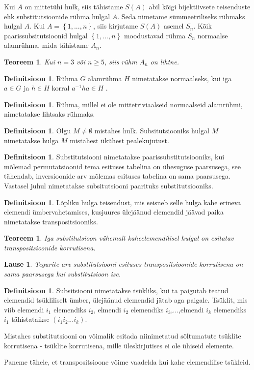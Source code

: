 \documentclass[12pt]{report}
\newcounter{def}
\theoremstyle{definition}
\newtheorem{normaalne_alamruhm}[def]{Definitsioon}
\newtheorem{lihtne_alamruhm}[def]{Definitsioon}
\newtheorem{substitutsioon}[def]{Definitsioon}
\newtheorem{paarissubstitutsioon}[def]{Definitsioon}
\newtheorem{transpositsioon}[def]{Definitsioon}
\newtheorem{tsukel}[def]{Definitsioon}
\theoremstyle{plain}
\newcounter{teoreem}
\newtheorem{paaris_subsitutsioonide_hulk}[teoreem]{Teoreem}
\newtheorem{trans_korrutis}[teoreem]{Teoreem}
\newtheorem{trans_korrutis_sub}[teoreem]{Lause}
\begin{document}
Kui $A$ on mittet\"uhi hulk, siis tähistame $S(A)$ abil kõigi bijektiivsete teisenduste ehk substitutsioonide r\"uhma hulgal $A$. Seda nimetame s\"ummeetriliseks r\"uhmaks hulgal $A$. Kui $A=\left\lbrace 1,...,n \right\rbrace$, siis kirjutame $S(A)$ asemel $S_n$. Kõik paarissubsitutsioonid hulgal $\left\lbrace 1,...,n \right\rbrace$ moodustavad r\"uhma $S_n$ normaalse alamr\"uhma, mida tähistame $A_n$. 
\begin{paaris_subsitutsioonide_hulk}
Kui $n=3$ või $n \geq 5$, siis r\"uhm $A_n$ on lihtne.
\end{paaris_subsitutsioonide_hulk}

\begin{normaalne_alamruhm}
R\"uhma $G$ alamr\"uhma $H$ nimetatakse normaalseks, kui iga $a \in G$ ja $h \in H$  korral $a^{-1}ha \in H$ .
\end{normaalne_alamruhm}
\begin{lihtne_alamruhm}
R\"uhma, millel ei ole mittetriviaalseid normaalseid alamr\"uhmi, nimetatakse lihtsaks r\"uhmaks.
\end{lihtne_alamruhm}
\begin{substitutsioon}
Olgu $M \neq \emptyset$ mistahes hulk. Subsitutsiooniks hulgal $M$ nimetatakse hulga $M$ mistahest \"uk\"uhest pealekujutust.
\end{substitutsioon}
\begin{paarissubstitutsioon}
Substitutsiooni nimetatakse paarissubstitutsiooniks, kui mõlemad permutatsioonid tema esituses tabelina on \"uhesuguse paarsusega, see tähendab, inversioonide arv mõlemas esituses tabelina on sama paarsusega. Vastasel juhul nimetatakse subsitutsiooni paarituks substitutsiooniks.
\end{paarissubstitutsioon}
\begin{transpositsioon}
Lõpliku hulga teisendust, mis seisneb selle hulga kahe erineva elemendi \"umbervahetamises, kusjuures \"ulejäänud elemendid jäävad paika nimetatakse transpositsiooniks. 
\end{transpositsioon}
\begin{trans_korrutis}
Iga substitutsioon vähemalt kaheelemendilisel hulgal on esitatav transpositsioonide korrutisena.
\end{trans_korrutis}
\begin{trans_korrutis_sub}
Tegurite arv substitutsiooni esituses transpositsioonide korrutisena on sama paarsusega kui substitutsioon ise.
\end{trans_korrutis_sub}
\begin{tsukel}
Subsitsiooni nimetatakse ts\"ukliks, kui ta paigutab teatud elemendid ts\"ukliliselt \"umber, \"ulejäänud elemendid jätab aga paigale. Ts\"uklit, mis viib elemendi $i_1$ elemendiks $i_2$, elmendi $i_2$ elemendiks $i_3$,...,elmendi $i_k$ elemendiks $i_1$ tähistataikse $\left(i_1 i_2 ... i_k \right)$.
\end{tsukel}
Mistahes substitutsiooni on võimalik esitada niinimetatud sõltumatute ts\"uklite korrutisena - ts\"uklite korrutisena, mille \"uleskirjutises ei ole \"uhiseid elemente.

Paneme tähele, et transpositsioone võime vaadelda kui kahe elemendilise ts\"ukleid.
\end{document}
